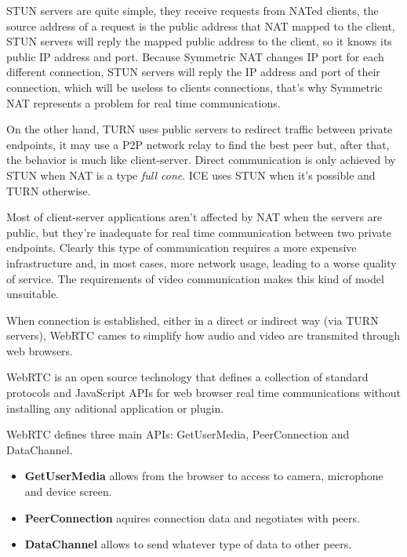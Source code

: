 \ac{STUN} servers are quite simple, they receive requests from \ac{NAT}ed clients, the source address of a request is the public address that \ac{NAT} mapped to the client, \ac{STUN} servers will reply the mapped public address to the client, so it knows its public \ac{IP} address and port. Because Symmetric \ac{NAT} changes \ac{IP} port for each different connection, \ac{STUN} servers will reply the \ac{IP} address and port of their connection, which will be useless to clients connections, that's why Symmetric \ac{NAT} represents a problem for real time communications.   

On the other hand, \ac{TURN} uses public servers to redirect traffic between private endpoints, it may use a \ac{P2P} network relay to find the best peer but, after that, the behavior is much like client-server. Direct communication is only achieved by \ac{STUN} when \ac{NAT} is a type \textit{full cone}. \ac{ICE} uses \ac{STUN} when it's possible and \ac{TURN} otherwise.

Most of client-server applications aren't affected by \ac{NAT} when the servers are public, but they're inadequate for real time communication between two private endpoints. Clearly this type of communication requires a more expensive infrastructure and, in most cases, more network usage, leading to a worse quality of service. The requirements of video communication makes this kind of model unsuitable.

When connection is established, either in a direct or indirect way (via \ac{TURN} servers), \ac{WebRTC} cames to simplify how audio and video are transmited through web browsers.

\ac{WebRTC} is an open source technology that defines a collection of standard protocols and JavaScript \ac{API}s for web browser real time communications without installing any aditional application or plugin.

\ac{WebRTC} defines three main \ac{API}s: GetUserMedia, PeerConnection and DataChannel. 

\begin{itemize}
  \item \textbf{GetUserMedia} allows from the browser to access to camera, microphone and device screen. 

  \item \textbf{PeerConnection} aquires connection data and negotiates with peers.

  \item \textbf{DataChannel} allows to send whatever type of data to other peers.
\end{itemize}

